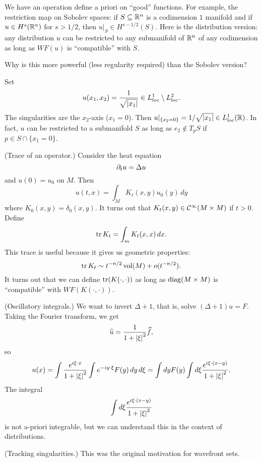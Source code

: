 \begin{exam}
  \lv
  \begin{enum}
    \io
    We have an operation define a priori on ``good'' functions.
    For example, the restriction map on Sobolev spaces: if $S \subseteq \mathbb{R}^n$ is a codimension $1$ manifold and if $u\in H^s(\mathbb{R}^n)$ for $s>1/2$, then $u|_S\in H^{s-1/2}(S)$.
    Here is the distribution version: any distribution $u$ can be restricted to any submanifold of $\mathbb{R}^n$ of any codimension as long as $WF(u)$ is ``compatible'' with $S$.

    Why is this more powerful (less regularity required) than the Sobolev version?

    \begin{enum}
      \io
      Set
      \[ u(x_1,x_2) = \frac{1}{\sqrt{\left\lvert x_1 \right\rvert}} \in L_{\operatorname{loc}}^1 \setminus L_{\operatorname{loc}}^2. \]
      The singularities are the $x_2$-axis ($x_1=0$).
      Then $u|_{\{x_2=0\}}=1/\sqrt{\left\lvert x_1 \right\rvert} \in L_{\operatorname{loc}}^1(\mathbb{R})$.
      In fact, $u$ can be restricted to a submanifold $S$ as long as $e_2 \notin T_pS$ if $p \in S \cap \{x_1=0\}$.

      \io
      (Trace of an operator.)
      Consider the heat equation
      \[ \partial_t u = \Delta u \]
      and $u(0)=u_0$ on $M$.
      Then
      \[ u(t,x) = \int_M K_t(x,y) u_0(y) \, dy \]
      where $K_0(x,y) = \delta_0(x,y)$.
      It turns out that $K_t(x,y) \in \mathcal{C}^\infty(M \times M)$ if $t>0$.
      Define
      \[ \operatorname{tr} K_t = \int_m K_t(x,x) \, dx. \]
      This trace is useful because it gives us geometric properties:
      \[ \operatorname{tr} K_t \sim t^{-n/2} \operatorname{vol}(M) + o(t^{-n/2}). \]
      It turns out that we can define $\operatorname{tr}(K(\cdot,\cdot))$ as long as $\operatorname{diag}(M \times M)$ is ``compatible'' with $WF(K(\cdot,\cdot))$.
    \end{enum}

    \io
    (Oscillatory integrals.)
    We want to invert $\Delta+1$, that is, solve $(\Delta+1)u=F$.
    Taking the Fourier transform, we get
    \[ \widehat u = \frac1{1+\left\lvert \xi \right\rvert^2} \widehat f, \]
    so
    \[ u(x) = \int \frac{e^{i\xi\cdot x}}{1+\left\lvert \xi \right\rvert^2} \int e^{-iy \cdot\xi} F(y) \, dy \, d\xi = \int dy F(y) \int d\xi \frac{e^{i\xi\cdot(x-y)}}{1+\left\lvert \xi \right\rvert^2}. \]
    The integral
    \[ \int d\xi \frac{e^{i\xi\cdot(x-y)}}{1+\left\lvert \xi \right\rvert^2} \]
    is not a-priori integrable, but we can understand this in the context of distributions.

    \io
    (Tracking singularities.)
    This was the original motivation for wavefront sets.
  \end{enum}
\end{exam}

